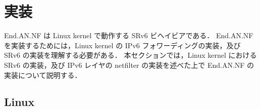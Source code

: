 \section{実装}
\label{section:implementation}
End.AN.NF は Linux kernel で動作する SRv6 ビヘイビアである．
End.AN.NF を実装するためには，Linux kernel の IPv6 フォワーディングの実装，及び SRv6 の実装を理解する必要がある．
本セクションでは，Linux kernel における SRv6 の実装，及び IPv6 レイヤの netfilter の実装を述べた上で End.AN.NF の実装について説明する．

\subsection{Linux }
\label{sbsection:linux-packet-forwarding}
